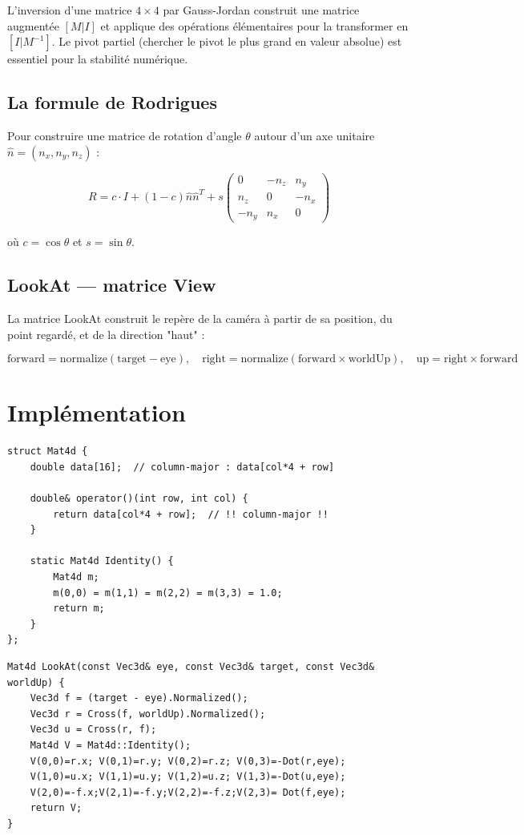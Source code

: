 \documentclass[12pt,a4paper]{report}
\begin{document}
L'inversion d'une matrice $4\times4$ par Gauss-Jordan construit une matrice augmentée $[M | I]$ et applique des opérations élémentaires pour la transformer en $[I | M^{-1}]$. Le pivot partiel (chercher le pivot le plus grand en valeur absolue) est essentiel pour la stabilité numérique.

\subsection{La formule de Rodrigues}

Pour construire une matrice de rotation d'angle $\theta$ autour d'un axe unitaire $\hat{n} = (n_x, n_y, n_z)$ :

$$
R = c \cdot I + (1-c) \hat{n}\hat{n}^T + s \begin{pmatrix} 0 & -n_z & n_y \\ n_z & 0 & -n_x \\ -n_y & n_x & 0 \end{pmatrix}
$$

où $c = \cos\theta$ et $s = \sin\theta$.

\subsection{LookAt — matrice View}

La matrice LookAt construit le repère de la caméra à partir de sa position, du point regardé, et de la direction "haut" :

$$
\text{forward} = \text{normalize}(\text{target} - \text{eye}), \quad
\text{right} = \text{normalize}(\text{forward} \times \text{worldUp}), \quad
\text{up} = \text{right} \times \text{forward}
$$

\section{Implémentation}

\begin{lstlisting}[caption={Accès column-major dans Mat4d}]
struct Mat4d {
    double data[16];  // column-major : data[col*4 + row]
    
    double& operator()(int row, int col) {
        return data[col*4 + row];  // !! column-major !!
    }
    
    static Mat4d Identity() {
        Mat4d m;
        m(0,0) = m(1,1) = m(2,2) = m(3,3) = 1.0;
        return m;
    }
};
\end{lstlisting}

\begin{lstlisting}[caption={LookAt — Matrice View}]
Mat4d LookAt(const Vec3d& eye, const Vec3d& target, const Vec3d& worldUp) {
    Vec3d f = (target - eye).Normalized();
    Vec3d r = Cross(f, worldUp).Normalized();
    Vec3d u = Cross(r, f);
    Mat4d V = Mat4d::Identity();
    V(0,0)=r.x; V(0,1)=r.y; V(0,2)=r.z; V(0,3)=-Dot(r,eye);
    V(1,0)=u.x; V(1,1)=u.y; V(1,2)=u.z; V(1,3)=-Dot(u,eye);
    V(2,0)=-f.x;V(2,1)=-f.y;V(2,2)=-f.z;V(2,3)= Dot(f,eye);
    return V;
}
\end{lstlisting}
\end{document}
